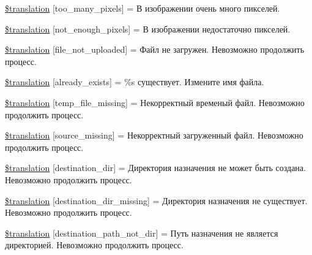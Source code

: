 \begin{DoxyCompactItemize}
\item 
\hyperlink{class_8upload_8ru___r_u_8php_aa4051ef64e94a3f8295c63cf85544016}{\$translation} \mbox{[}\textquotesingle{}too\+\_\+many\+\_\+pixels\textquotesingle{}\mbox{]} = \textquotesingle{}В изображении очень много пикселей.\textquotesingle{}
\item 
\hyperlink{class_8upload_8ru___r_u_8php_a1fe342c27ce61f4ff4e0120ba647033e}{\$translation} \mbox{[}\textquotesingle{}not\+\_\+enough\+\_\+pixels\textquotesingle{}\mbox{]} = \textquotesingle{}В изображении недостаточно пикселей.\textquotesingle{}
\item 
\hyperlink{class_8upload_8ru___r_u_8php_a4ce76e7be0b3a03c2b47f6d70c21832e}{\$translation} \mbox{[}\textquotesingle{}file\+\_\+not\+\_\+uploaded\textquotesingle{}\mbox{]} = \textquotesingle{}Файл не загружен. Невозможно продолжить процесс.\textquotesingle{}
\item 
\hyperlink{class_8upload_8ru___r_u_8php_afd84e910217f04139f567c41e292afa5}{\$translation} \mbox{[}\textquotesingle{}already\+\_\+exists\textquotesingle{}\mbox{]} = \textquotesingle{}\%s существует. Измените имя файла.\textquotesingle{}
\item 
\hyperlink{class_8upload_8ru___r_u_8php_ab0fa87a88aba2624004581eed0633325}{\$translation} \mbox{[}\textquotesingle{}temp\+\_\+file\+\_\+missing\textquotesingle{}\mbox{]} = \textquotesingle{}Некорректный временый файл. Невозможно продолжить процесс.\textquotesingle{}
\item 
\hyperlink{class_8upload_8ru___r_u_8php_aceaaf7355acaaf10f0ae60378d03c468}{\$translation} \mbox{[}\textquotesingle{}source\+\_\+missing\textquotesingle{}\mbox{]} = \textquotesingle{}Некорректный загруженный файл. Невозможно продолжить процесс.\textquotesingle{}
\item 
\hyperlink{class_8upload_8ru___r_u_8php_aff2427c72a2598aefa6d58df1dd18b08}{\$translation} \mbox{[}\textquotesingle{}destination\+\_\+dir\textquotesingle{}\mbox{]} = \textquotesingle{}Директория назначения не может быть создана. Невозможно продолжить процесс.\textquotesingle{}
\item 
\hyperlink{class_8upload_8ru___r_u_8php_a9ef28d3cf09942c6c0a1e77fa09185e8}{\$translation} \mbox{[}\textquotesingle{}destination\+\_\+dir\+\_\+missing\textquotesingle{}\mbox{]} = \textquotesingle{}Директория назначения не существует. Невозможно продолжить процесс.\textquotesingle{}
\item 
\hyperlink{class_8upload_8ru___r_u_8php_a5704a67137126e8c87b7a364175929d4}{\$translation} \mbox{[}\textquotesingle{}destination\+\_\+path\+\_\+not\+\_\+dir\textquotesingle{}\mbox{]} = \textquotesingle{}Путь назначения не является директорией. Невозможно продолжить процесс.\textquotesingle{}

\end{DoxyCompactItemize}
